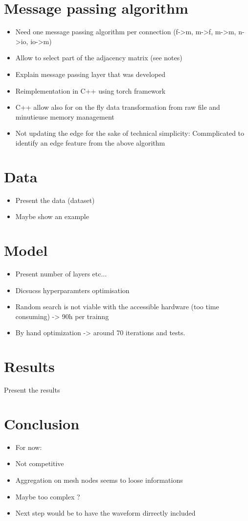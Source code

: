 \documentclass[../main.tex]{subfiles}
\begin{document}
\section{Message passing algorithm}
\begin{itemize}
  \item Need one message passing algorithm per connection (f->m, m->f, m->m, n->io, io->m)
  \item Allow to select part of the adjacency matrix (see notes)
  \item Explain message passing layer that was developed
  \item Reimplementation in C++ using torch framework
  \item C++ allow also for on the fly data transformation from raw file and minutieuse memory management
  \item Not updating the edge for the sake of technical simplicity: Commplicated to identify an edge feature from the above algorithm
\end{itemize}

\section{Data}
\begin{itemize}
  \item Present the data (dataset)
  \item Maybe show an example
\end{itemize}

\section{Model}
\begin{itemize}
  \item Present number of layers etc...
  \item Dicsucss hyperparamters optimisation
  \item Random search is not viable with the accessible hardware (too time consuming) -> 90h per trainng
  \item By hand optimization -> around 70 iterations and tests.
\end{itemize}

\section{Results}
Present the results

\section{Conclusion}
\begin{itemize}
  \item For now:
  \item Not competitive
  \item Aggregation on mesh nodes seems to loose informations
  \item Maybe too complex ?
  \item Next step would be to have the waveform dirrectly included
\end{itemize}
\end{document}
